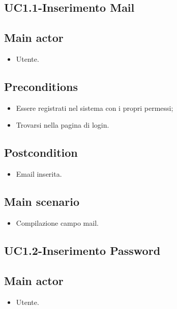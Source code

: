 \documentclass{article}
\begin{document}
\subsection{UC1.1-Inserimento Mail}
    
     \subsection*{Main actor}
         \begin{itemize}
             \item Utente.
         \end{itemize}
     \subsection*{Preconditions} 
        \begin{itemize}
            \item Essere registrati nel sistema con i propri permessi;
            \item Trovarsi nella pagina di login.
        \end{itemize}
        \subsection*{Postcondition} 
        \begin{itemize}
            \item Email inserita.
        \end{itemize}
        \subsection*{Main scenario}
        \begin{itemize}
        \item Compilazione campo mail.
        \end{itemize}

\subsection{UC1.2-Inserimento Password}
    
     \subsection*{Main actor}
         \begin{itemize}
             \item Utente.
         \end{itemize}
\end{document}
